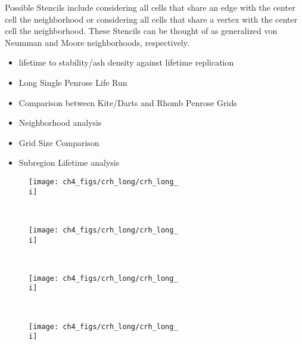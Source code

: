 Possible Stencils include considering all cells that share an edge with the center cell the neighborhood or considering all cells that share a vertex with the center cell the neighborhood. These Stencils can be thought of as generalized von Neumman and Moore neighborhoods, respectively.

\begin{itemize}
\item lifetime to stability/ash density against lifetime replication
\item Long Single Penrose Life Run
\item Comparison between Kite/Darts and Rhomb Penrose Grids
\item Neighborhood analysis

\item Grid Size Comparison

\item Subregion Lifetime analysis
\end{itemize}


 
        \begin{subfigure}[t]{0.2\textwidth}
    \centering
    \texttt{[image: ch4\_figs/crh\_long/crh\_long\_\\i]}
    \end{subfigure} 
    ~
    \begin{subfigure}[t]{0.2\textwidth}
    \centering
    \texttt{[image: ch4\_figs/crh\_long/crh\_long\_\\i]}
    \end{subfigure}
    ~
    \begin{subfigure}[t]{0.2\textwidth}
    \centering
    \texttt{[image: ch4\_figs/crh\_long/crh\_long\_\\i]}
    \end{subfigure}
    ~
    \begin{subfigure}[t]{0.2\textwidth}
    \centering
    \texttt{[image: ch4\_figs/crh\_long/crh\_long\_\\i]}
    \end{subfigure}






\iffalse
\multido{\i=0+1}{66}{
    \subcaptionbox{\i}{\texttt{[image: ch4\_figs/crh\_long/crh\_long\_\\i]}}&
    \subcaptionbox{\i}{\texttt{[image: ch4\_figs/crh\_long/crh\_long\_\\i]}}&
    \subcaptionbox{\i}{\texttt{[image: ch4\_figs/crh\_long/crh\_long\_\\i]}}&
    \subcaptionbox{\i}{\texttt{[image: ch4\_figs/crh\_long/crh\_long\_\\i]}}\\
}
\fi

